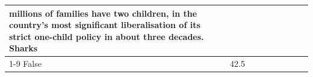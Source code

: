 \begin{table}[H]
\begin{tabular}{lllrlllll}
millions of families have two children, in the country's most significant liberalisation of its strict one-child policy in about three decades. Sharks \\
\cline{1-9}
False & 42.5%
\end{tabular}
\end{table}
